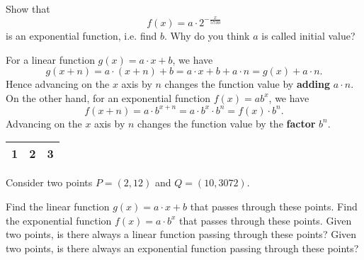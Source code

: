 \begin{exercise}
	Show that
	\begin{equation*}
		f\left(x\right)=a\cdot 2^{-\frac{x}{5730}}
	\end{equation*}
	is an exponential function, i.e. find $b$.
	Why do you think $a$ is called initial value?
\end{exercise}
\pagebreak[1]
For a linear function $g\left(x\right)=a\cdot x+b$, we have
\begin{equation*}
	g\left(x+n\right)=a\cdot\left(x+n\right)+b=a\cdot x+b+a\cdot n=g\left(x\right)+a\cdot n.
\end{equation*}
Hence advancing on the $x$ axis by $n$ changes the function value by \textbf{adding} $a\cdot n$.
On the other hand, for an exponential function $f(x)=ab^x$, we have
\begin{equation*}
	f\left(x+n\right)=a\cdot b^{x+n}=a\cdot b^x\cdot b^n=f\left(x\right)\cdot b^n.
\end{equation*}
Advancing on the $x$ axis by $n$ changes the function value by the \textbf{factor} $b^n$.
\begin{exercise}
	\begin{tabular}{|c|c|c|}\hline
		1 & 2 & 3 \\ \hline
	\end{tabular}
\end{exercise}
\begin{exercise}
	Consider two points $P=\left(2,12\right)$ and $Q=\left(10,3072\right)$.
	\begin{tasks}
		\task Find the linear function $g\left(x\right)=a\cdot x+b$ that passes through these points.
		\task Find the exponential function $f\left(x\right)=a\cdot b^x$ that passes through these points.
		\task Given two points, is there always a linear function passing through these points?
		\task Given two points, is there always an exponential function passing through these points?
	\end{tasks}
\end{exercise}
